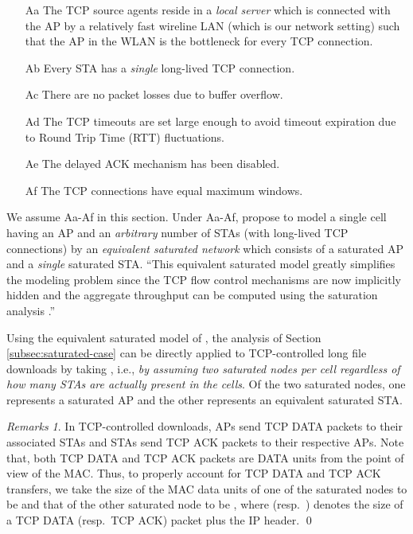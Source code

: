 \documentclass[10pt,a4paper,journal]{IEEEtran}
\theoremstyle{definition}
\theoremstyle{remark}
\newtheorem{remark}{Remarks}[section] \newtheorem{discussion}{Discussion}[section] \newtheorem{example}{Example}[section]
\theoremstyle{plain}
\begin{document}
\begin{itemize}

\item [Aa] The TCP source agents reside in a \textit{local server} which is connected with the AP by a relatively fast wireline LAN (which is our network setting) such that the AP in the WLAN is the bottleneck for every TCP connection.

\item [Ab] Every STA has a \textit{single} long-lived TCP connection.

\item [Ac] There are no packet losses due to buffer overflow.

\item [Ad] The TCP timeouts are set large enough to avoid timeout expiration due to Round Trip Time (RTT) fluctuations.

\item [Ae] The delayed ACK mechanism has been disabled.

\item [Af] The TCP connections have equal maximum windows.

\end{itemize}



We assume Aa-Af in this section. Under Aa-Af, \cite{wanet.bruno08TCPeqvSatModel} propose to model a single cell having an AP and an \textit{arbitrary} number of STAs (with long-lived TCP connections) by an \textit{equivalent saturated network} which consists of a saturated AP and a \textit{single} saturated STA. ``This equivalent saturated model greatly simplifies the modeling problem since the TCP flow control mechanisms are now implicitly hidden and the aggregate throughput can be computed using the saturation analysis \cite{wanet.bruno08TCPeqvSatModel}.'' 

Using the equivalent saturated model of \cite{wanet.bruno08TCPeqvSatModel}, the analysis of Section \ref{subsec:saturated-case} can be directly applied to TCP-controlled long file downloads by taking , i.e., \textit{by assuming two saturated nodes per cell regardless of how many STAs are actually present in the cells}. Of the two saturated nodes, one represents a saturated AP and the other represents an equivalent saturated STA.


\begin{remark}
\label{rmk:TCP-up-down-traffic}
In TCP-controlled downloads, APs send TCP DATA packets to their associated STAs and STAs send TCP ACK packets to their respective APs. Note that, both TCP DATA and TCP ACK packets are DATA units from the point of view of the MAC. Thus, to properly account for TCP DATA and TCP ACK transfers, we take the size of the MAC data units of one of the saturated nodes to be  and that of the other saturated node to be , where  (resp.~) denotes the size of a TCP DATA (resp.~TCP ACK) packet plus the IP header. \hfill \qed
\end{remark}
\end{document}
